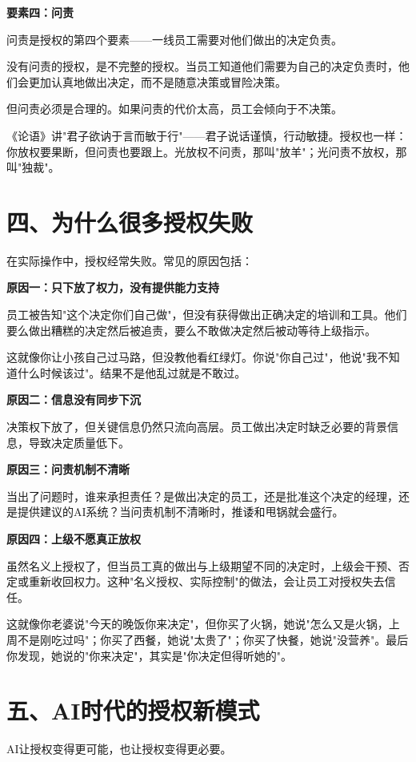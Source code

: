 \textbf{要素四：问责}

问责是授权的第四个要素——一线员工需要对他们做出的决定负责。

没有问责的授权，是不完整的授权。当员工知道他们需要为自己的决定负责时，他们会更加认真地做出决定，而不是随意决策或冒险决策。

但问责必须是合理的。如果问责的代价太高，员工会倾向于不决策。

《论语》讲"君子欲讷于言而敏于行"——君子说话谨慎，行动敏捷。授权也一样：你放权要果断，但问责也要跟上。光放权不问责，那叫"放羊"；光问责不放权，那叫"独裁"。

\section{四、为什么很多授权失败}


在实际操作中，授权经常失败。常见的原因包括：

\textbf{原因一：只下放了权力，没有提供能力支持}

员工被告知"这个决定你们自己做"，但没有获得做出正确决定的培训和工具。他们要么做出糟糕的决定然后被追责，要么不敢做决定然后被动等待上级指示。

这就像你让小孩自己过马路，但没教他看红绿灯。你说"你自己过"，他说"我不知道什么时候该过"。结果不是他乱过就是不敢过。

\textbf{原因二：信息没有同步下沉}

决策权下放了，但关键信息仍然只流向高层。员工做出决定时缺乏必要的背景信息，导致决定质量低下。

\textbf{原因三：问责机制不清晰}

当出了问题时，谁来承担责任？是做出决定的员工，还是批准这个决定的经理，还是提供建议的AI系统？当问责机制不清晰时，推诿和甩锅就会盛行。

\textbf{原因四：上级不愿真正放权}

虽然名义上授权了，但当员工真的做出与上级期望不同的决定时，上级会干预、否定或重新收回权力。这种"名义授权、实际控制"的做法，会让员工对授权失去信任。

这就像你老婆说"今天的晚饭你来决定"，但你买了火锅，她说"怎么又是火锅，上周不是刚吃过吗"；你买了西餐，她说"太贵了"；你买了快餐，她说"没营养"。最后你发现，她说的"你来决定"，其实是"你决定但得听她的"。

\section{五、AI时代的授权新模式}


AI让授权变得更可能，也让授权变得更必要。

